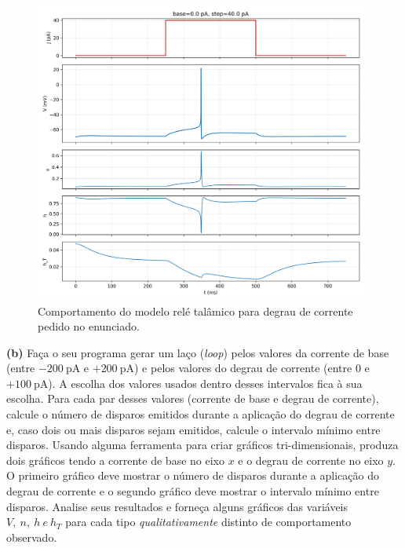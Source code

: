 \documentclass[english,11pt,a4paper]{article}
\begin{document}
	\begin{figure}[H]
		\centering
		\includegraphics[width=11cm]{../figures/ex_2a.png}	
		\caption{Comportamento do modelo relé talâmico para degrau de corrente pedido no enunciado.}
	\end{figure}
	
	\noindent \textbf{(b)} Faça o seu programa gerar um laço (\textit{loop}) pelos valores da corrente de base (entre $-200 \ \text{pA}$ e $+200 \ \text{pA}$) e pelos valores do degrau de corrente (entre $0$ e $+100 \ \text{pA}$). A escolha dos valores usados dentro desses intervalos fica à sua escolha. Para cada par desses valores (corrente de base e degrau de corrente), calcule o número de disparos emitidos durante a aplicação do degrau de corrente e, caso dois ou mais disparos sejam emitidos, calcule o intervalo mínimo entre disparos. Usando alguma ferramenta para criar gráficos tri-dimensionais, produza dois gráficos tendo a corrente de base no eixo $x$ e o degrau de corrente no eixo $y$. O primeiro gráfico deve mostrar o número de disparos durante a aplicação do degrau de corrente e o segundo gráfico deve mostrar o intervalo mínimo entre disparos. Analise seus resultados e forneça alguns gráficos das variáveis $V, \ n, \ h \ e \ h_T$ para cada tipo \textit{qualitativamente} distinto de comportamento observado.
	
\end{document}
